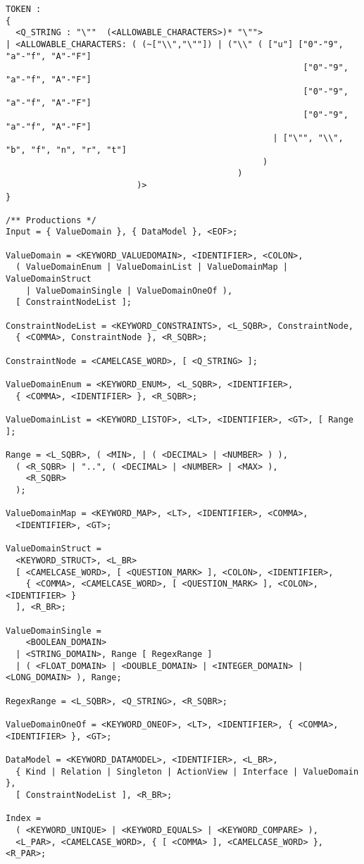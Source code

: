 \begin{lstlisting}[basicstyle={\scriptsize\sffamily},breaklines=true,showstringspaces=false,tabsize=2]
TOKEN :
{
  <Q_STRING : "\""  (<ALLOWABLE_CHARACTERS>)* "\"">
| <ALLOWABLE_CHARACTERS: ( (~["\\","\""]) | ("\\" ( ["u"] ["0"-"9", "a"-"f", "A"-"F"]
														   ["0"-"9", "a"-"f", "A"-"F"]
														   ["0"-"9", "a"-"f", "A"-"F"]
														   ["0"-"9", "a"-"f", "A"-"F"]
      											     | ["\"", "\\", "b", "f", "n", "r", "t"]
      											   )
      										  )
      					  )> 
}

/** Productions */
Input = { ValueDomain }, { DataModel }, <EOF>;

ValueDomain = <KEYWORD_VALUEDOMAIN>, <IDENTIFIER>, <COLON>,
  ( ValueDomainEnum | ValueDomainList | ValueDomainMap | ValueDomainStruct
    | ValueDomainSingle | ValueDomainOneOf ), 
  [ ConstraintNodeList ];

ConstraintNodeList = <KEYWORD_CONSTRAINTS>, <L_SQBR>, ConstraintNode,
  { <COMMA>, ConstraintNode }, <R_SQBR>;

ConstraintNode = <CAMELCASE_WORD>, [ <Q_STRING> ];

ValueDomainEnum = <KEYWORD_ENUM>, <L_SQBR>, <IDENTIFIER>,
  { <COMMA>, <IDENTIFIER> }, <R_SQBR>;

ValueDomainList = <KEYWORD_LISTOF>, <LT>, <IDENTIFIER>, <GT>, [ Range ];

Range = <L_SQBR>, ( <MIN>, | ( <DECIMAL> | <NUMBER> ) ),
  ( <R_SQBR> | "..", ( <DECIMAL> | <NUMBER> | <MAX> ),
    <R_SQBR>
  );

ValueDomainMap = <KEYWORD_MAP>, <LT>, <IDENTIFIER>, <COMMA>,
  <IDENTIFIER>, <GT>;

ValueDomainStruct = 
  <KEYWORD_STRUCT>, <L_BR>
  [ <CAMELCASE_WORD>, [ <QUESTION_MARK> ], <COLON>, <IDENTIFIER>,
    { <COMMA>, <CAMELCASE_WORD>, [ <QUESTION_MARK> ], <COLON>, <IDENTIFIER> }
  ], <R_BR>;

ValueDomainSingle = 
    <BOOLEAN_DOMAIN> 
  | <STRING_DOMAIN>, Range [ RegexRange ] 
  | ( <FLOAT_DOMAIN> | <DOUBLE_DOMAIN> | <INTEGER_DOMAIN> | <LONG_DOMAIN> ), Range;

RegexRange = <L_SQBR>, <Q_STRING>, <R_SQBR>;

ValueDomainOneOf = <KEYWORD_ONEOF>, <LT>, <IDENTIFIER>, { <COMMA>, <IDENTIFIER> }, <GT>;

DataModel = <KEYWORD_DATAMODEL>, <IDENTIFIER>, <L_BR>,
  { Kind | Relation | Singleton | ActionView | Interface | ValueDomain },
  [ ConstraintNodeList ], <R_BR>;

Index =
  ( <KEYWORD_UNIQUE> | <KEYWORD_EQUALS> | <KEYWORD_COMPARE> ),
  <L_PAR>, <CAMELCASE_WORD>, { [ <COMMA> ], <CAMELCASE_WORD> }, <R_PAR>;


\end{lstlisting}
